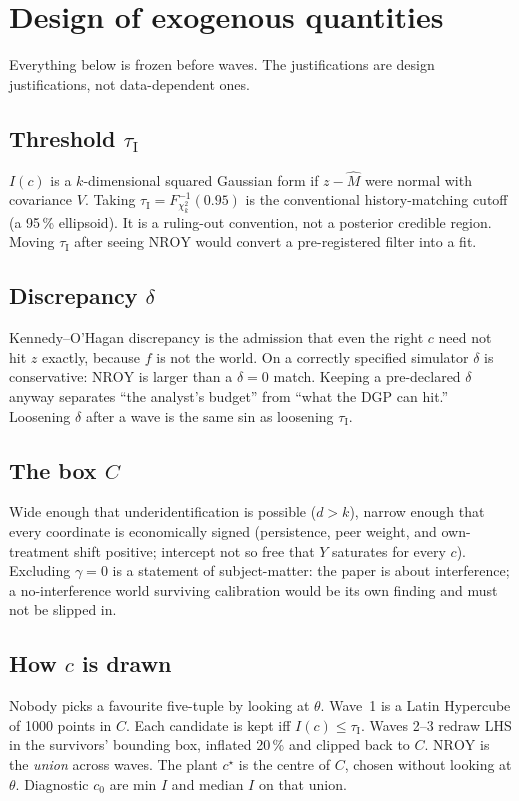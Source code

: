 \documentclass[11pt]{article}
\newcommand{\NROY}{\mathrm{NROY}}
\newcommand{\thr}{\tau_{\mathrm{I}}}
\begin{document}
\section{Design of exogenous quantities}

Everything below is frozen before waves. The justifications are
design justifications, not data-dependent ones.

\subsection{Threshold $\thr$}
$I(c)$ is a $k$-dimensional squared Gaussian form if $z-\widehat M$
were normal with covariance $V$. Taking $\thr=F^{-1}_{\chi^2_k}(0.95)$
is the conventional history-matching cutoff (a 95\,\% ellipsoid). It is
a ruling-out convention, not a posterior credible region. Moving
$\thr$ after seeing $\NROY$ would convert a pre-registered filter into
a fit.

\subsection{Discrepancy $\delta$}
Kennedy--O'Hagan discrepancy is the admission that even the right $c$
need not hit $z$ exactly, because $f$ is not the world. On a correctly
specified simulator $\delta$ is conservative: $\NROY$ is larger than a
$\delta=0$ match. Keeping a pre-declared $\delta$ anyway separates
``the analyst's budget'' from ``what the DGP can hit.'' Loosening
$\delta$ after a wave is the same sin as loosening $\thr$.

\subsection{The box $C$}
Wide enough that underidentification is possible ($d>k$), narrow enough
that every coordinate is economically signed (persistence, peer
weight, and own-treatment shift positive; intercept not so free that
$Y$ saturates for every $c$). Excluding $\gamma=0$ is a statement of
subject-matter: the paper is about interference; a no-interference
world surviving calibration would be its own finding and must not be
slipped in.

\subsection{How $c$ is drawn}
Nobody picks a favourite five-tuple by looking at $\theta$. Wave~1 is a
Latin Hypercube of 1000 points in $C$. Each candidate is kept iff
$I(c)\le\thr$. Waves 2--3 redraw LHS in the survivors' bounding box,
inflated 20\,\% and clipped back to $C$. $\NROY$ is the \emph{union}
across waves. The plant $c^\star$ is the centre of $C$, chosen without
looking at $\theta$. Diagnostic $c_0$ are min $I$ and median $I$ on
that union.
\end{document}
